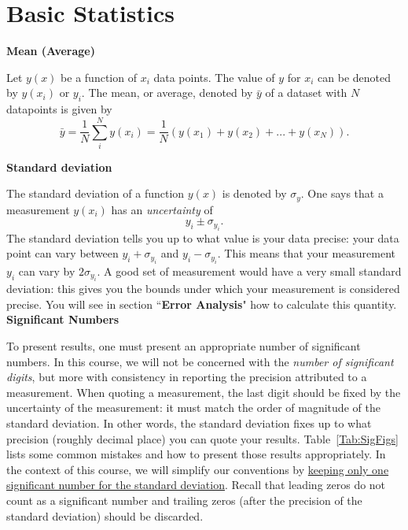 \documentclass[12pt]{report}
\begin{document}
\section{Basic Statistics} \label{Sect:Basic-statistics}

\noindent \large \textbf{Mean (Average)} \normalsize

Let $y(x)$ be a function of $x_i$ data points. The value of $y$ for $x_i$ can be denoted by $y(x_i)$ or $y_i$. The mean, or average, denoted by $\bar{y}$ of a dataset with $N$ datapoints is given by
\begin{equation}
\bar{y} = \frac{1}{N} \displaystyle \sum_{i}^N y(x_i) = \frac{1}{N} \left( y(x_1) + y(x_2) +... + y(x_N) \right).
\end{equation}

\noindent \large \textbf{Standard deviation} \normalsize

The standard deviation of a function $y(x)$ is denoted by $\sigma_y$. One says that a measurement $y(x_i)$ has an \textit{uncertainty} of
\begin{equation}
y_i \pm \sigma_{y_i}.
\end{equation}
The standard deviation tells you up to what value is your data precise: your data point can vary between $y_i + \sigma_{y_i}$ and $y_i - \sigma_{y_i}$. This means that your measurement $y_i$ can vary by $2 \sigma_{y_i}$. A good set of measurement would have a very small standard deviation: this gives you the bounds under which your measurement is considered precise. You will see in section ``\textbf{Error Analysis}" how to calculate this quantity. \\

\noindent \large \textbf{Significant Numbers} \normalsize

To present results, one must present an appropriate number of significant numbers. In this course, we will not be concerned with the \textit{number of significant digits}, but more with consistency in reporting the precision attributed to a measurement. 
When quoting a measurement, the last digit should be fixed by the uncertainty of the measurement: it must match the order of magnitude of the standard deviation. In other words, the standard deviation fixes up to what precision (roughly decimal place) you can quote your results. Table~\ref{Tab:SigFigs} lists some common mistakes and how to present those results appropriately. In the context of this course, we will simplify our conventions by \underline{keeping only one significant number for the standard deviation}. Recall that leading zeros do not count as a significant number and trailing zeros (after the precision of the standard deviation) should be discarded.
\end{document}
